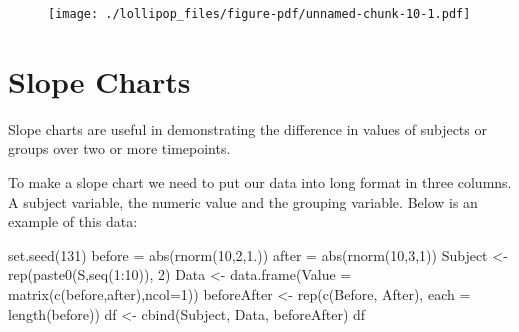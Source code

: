\documentclass[
  letterpaper,
  DIV=11,
  numbers=noendperiod]{scrreprt}
\newenvironment{Shaded}{\begin{snugshade}}{\end{snugshade}}
\newcommand{\AttributeTok}[1]{\textcolor[rgb]{0.40,0.45,0.13}{#1}}
\newcommand{\DecValTok}[1]{\textcolor[rgb]{0.68,0.00,0.00}{#1}}
\newcommand{\FloatTok}[1]{\textcolor[rgb]{0.68,0.00,0.00}{#1}}
\newcommand{\FunctionTok}[1]{\textcolor[rgb]{0.28,0.35,0.67}{#1}}
\newcommand{\NormalTok}[1]{\textcolor[rgb]{0.00,0.23,0.31}{#1}}
\newcommand{\OtherTok}[1]{\textcolor[rgb]{0.00,0.23,0.31}{#1}}
\newcommand{\SpecialCharTok}[1]{\textcolor[rgb]{0.37,0.37,0.37}{#1}}
\newcommand{\StringTok}[1]{\textcolor[rgb]{0.13,0.47,0.30}{#1}}
\begin{document}
\begin{figure}[H]

{\centering \texttt{[image: ./lollipop\_files/figure-pdf/unnamed-chunk-10-1.pdf]}

}

\end{figure}


\hypertarget{slope-charts}{%
\chapter{Slope Charts}\label{slope-charts}}

Slope charts are useful in demonstrating the difference in values of
subjects or groups over two or more timepoints.

To make a slope chart we need to put our data into long format in three
columns. A subject variable, the numeric value and the grouping
variable. Below is an example of this data:

\begin{Shaded}
\begin{Highlighting}[]
\FunctionTok{set.seed}\NormalTok{(}\DecValTok{131}\NormalTok{) }
\NormalTok{before }\OtherTok{=} \FunctionTok{abs}\NormalTok{(}\FunctionTok{rnorm}\NormalTok{(}\DecValTok{10}\NormalTok{,}\DecValTok{2}\NormalTok{,}\FloatTok{1.}\NormalTok{))}
\NormalTok{after }\OtherTok{=} \FunctionTok{abs}\NormalTok{(}\FunctionTok{rnorm}\NormalTok{(}\DecValTok{10}\NormalTok{,}\DecValTok{3}\NormalTok{,}\DecValTok{1}\NormalTok{))}
\NormalTok{Subject }\OtherTok{\textless{}{-}} \FunctionTok{rep}\NormalTok{(}\FunctionTok{paste0}\NormalTok{(}\StringTok{\textquotesingle{}S\textquotesingle{}}\NormalTok{,}\FunctionTok{seq}\NormalTok{(}\DecValTok{1}\SpecialCharTok{:}\DecValTok{10}\NormalTok{)), }\DecValTok{2}\NormalTok{)}
\NormalTok{Data }\OtherTok{\textless{}{-}} \FunctionTok{data.frame}\NormalTok{(}\AttributeTok{Value =} \FunctionTok{matrix}\NormalTok{(}\FunctionTok{c}\NormalTok{(before,after),}\AttributeTok{ncol=}\DecValTok{1}\NormalTok{))}
\NormalTok{beforeAfter }\OtherTok{\textless{}{-}} \FunctionTok{rep}\NormalTok{(}\FunctionTok{c}\NormalTok{(}\StringTok{\textquotesingle{}Before\textquotesingle{}}\NormalTok{, }\StringTok{\textquotesingle{}After\textquotesingle{}}\NormalTok{), }\AttributeTok{each =} \FunctionTok{length}\NormalTok{(before))}
\NormalTok{df }\OtherTok{\textless{}{-}} \FunctionTok{cbind}\NormalTok{(Subject, Data, beforeAfter)}
\NormalTok{df}
\end{Highlighting}
\end{Shaded}
\end{document}
